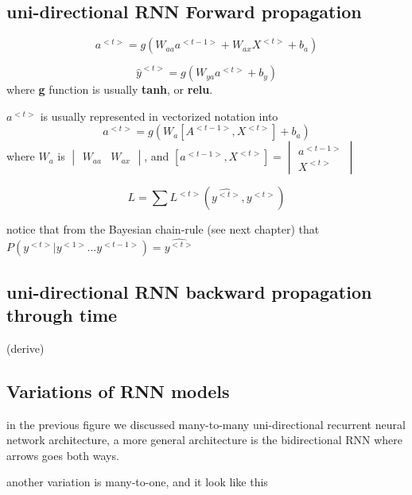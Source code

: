 \documentclass[4apaper,12pt]{book}
\begin{document}
\begin{description}
\begin{description}
      \section{uni-directional RNN Forward propagation}
      \begin{description}
      \item $$a^{<t>} = g(W_{aa}a^{<t-1>} + W_{ax}X^{<t>} + b_a) $$
      \item $$\hat{y}^{<t>} = g(W_{ya}a^{<t>} + b_y) $$  where \textbf{g} function is usually \textbf{tanh}, or \textbf{relu}.
      \item  $a^{<t>}$ is usually represented in vectorized notation into  $$ a^{<t>} = g(W_{a}[A^{<t-1>}, X^{<t>}] + b_a) $$ where $W_a$ is $\begin{vmatrix}W_{aa} & {W_{ax}}\end{vmatrix}$, and $[a^{<t-1>}, X^{<t>}]=\begin{vmatrix} a^{<t-1>} \\ X^{<t>} \end{vmatrix}$
      \item $$L=\sum {L^{<t>}(\hat{y^{<t>}},y^{<t>})}$$
      \item notice that from the Bayesian chain-rule (see next chapter) that $P(y^{<t>}|y^{<1>}\dots{y^{<t-1>}})=\hat{y^{<t>}}$
        \section{uni-directional RNN backward propagation through time}
        \begin{description}
        \item (derive)
        \end{description}
        \section {Variations of RNN models}
        \begin{description}
        \item in the previous figure we discussed many-to-many uni-directional recurrent neural network architecture, a more general architecture is the bidirectional RNN where arrows goes both ways.
        \item another variation is many-to-one, and it look like this

\end{description}
\end{description}
\end{description}
\end{description}
\end{document}
